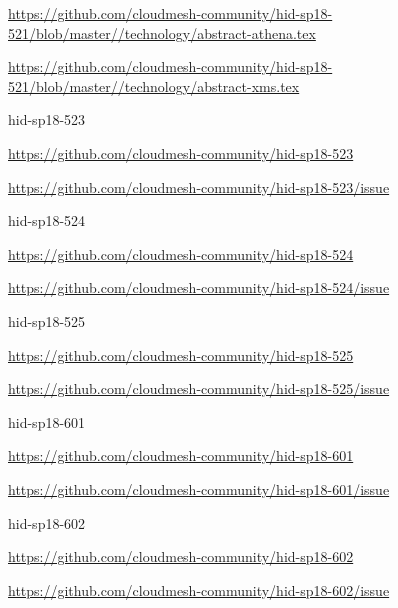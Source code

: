 \url{https://github.com/cloudmesh-community/hid-sp18-521/blob/master//technology/abstract-athena.tex}

\url{https://github.com/cloudmesh-community/hid-sp18-521/blob/master//technology/abstract-xms.tex}


hid-sp18-523

\url{https://github.com/cloudmesh-community/hid-sp18-523}

\url{https://github.com/cloudmesh-community/hid-sp18-523/issue}


hid-sp18-524

\url{https://github.com/cloudmesh-community/hid-sp18-524}

\url{https://github.com/cloudmesh-community/hid-sp18-524/issue}


hid-sp18-525

\url{https://github.com/cloudmesh-community/hid-sp18-525}

\url{https://github.com/cloudmesh-community/hid-sp18-525/issue}


hid-sp18-601

\url{https://github.com/cloudmesh-community/hid-sp18-601}

\url{https://github.com/cloudmesh-community/hid-sp18-601/issue}


hid-sp18-602

\url{https://github.com/cloudmesh-community/hid-sp18-602}

\url{https://github.com/cloudmesh-community/hid-sp18-602/issue}

